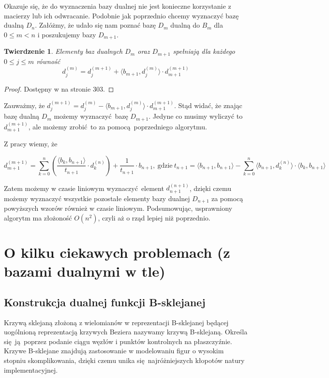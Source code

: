 \documentclass{article}
\newtheorem{thm}{Twierdzenie}
\begin{document}
Okazuje się, że do wyznaczenia bazy dualnej nie jest konieczne korzystanie z macierzy lub ich odwracanie. Podobnie jak poprzednio chcemy wyznaczyć bazę dualną $D_n$. Załóżmy, że udało się nam poznać bazę $D_m$ dualną do $B_m$ dla $0 \leq m < n$ i poszukujemy bazy $D_{m+1}$.

\begin{thm}
Elementy baz dualnych $D_m$ oraz $D_{m+1}$ spełniają dla każdego $0 \leq j \leq m$ równość
$$
d_j^{(m)} = d_j^{(m+1)} + \langle b_{m+1} , d_j^{(m)} \rangle \cdot d_{m+1}^{(m+1)}
$$
\end{thm}

\begin{proof}
Dostępny w \cite{PWO2} na stronie $303$.	
\end{proof}

Zauważmy, że $d_j^{(m+1)} = d_j^{(m)} - \langle b_{m+1} , d_j^{(m)} \rangle \cdot d_{m+1}^{(m+1)}$. Stąd widać, że znając bazę dualną $D_m$ możemy wyznaczyć bazę $D_{m+1}$. Jedyne co musimy wyliczyć to $d_{m+1}^{(m+1)}$, ale możemy zrobić to za pomocą poprzedniego algorytmu.

\pagebreak

Z pracy \cite{PWO1} wiemy, że 

$$
d_{m+1}^{(m+1)} = \sum_{k=0}^n \left( \frac{\langle b_k, b_{n+1} \rangle}{t_{n+1}} \cdot d_{k}^{(n)} \right) + \frac{1}{t_{n+1}} \cdot b_{n+1}, \ \text{gdzie} \ t_{n+1} = \langle b_{n+1}, b_{n+1} \rangle - \sum_{k=0}^n \langle b_{n+1}, d_{k}^{(n)} \rangle \cdot \langle b_k, b_{n+1} \rangle
$$

Zatem możemy w czasie liniowym wyznaczyć element $d_{n+1}^{(n+1)}$, dzięki czemu możemy wyznaczyć wszystkie pozostałe elementy bazy dualnej $D_{n+1}$ za pomocą powyższych wzorów również w czasie liniowym. Podsumowując, usprawniony algorytm ma złożoność $O(n^2)$, czyli aż o rząd lepiej niż poprzednio.

\section{O kilku ciekawych problemach (z bazami dualnymi w tle)}

\subsection{Konstrukcja dualnej funkcji B-sklejanej}

Krzywą sklejaną złożoną z wielomianów w reprezentacji B-sklejanej będącej uogólnioną reprezentacją krzywych Beziera nazywamy krzywą B-sklejaną. Określa się ją poprzez podanie ciągu węzłów i punktów kontrolnych na płaszczyźnie. Krzywe B-sklejane znajdują zastosowanie w modelowaniu figur o wysokim stopniu skomplikowania, dzięki czemu unika się najróżniejszych kłopotów natury implementacyjnej.\\
\end{document}
